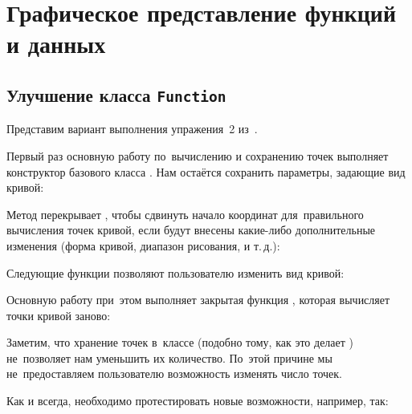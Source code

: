 
\chapter{Графическое представление функций и данных}

\section{Улучшение класса \texttt{Function}}
Представим вариант выполнения упражения~2 из~.


Первый раз основную работу по~вычислению и сохранению точек выполняет конструктор базового класса . Нам остаётся сохранить параметры, задающие вид кривой:


Метод  перекрывает , чтобы сдвинуть начало координат для~правильного вычисления точек кривой, если будут внесены какие-либо дополнительные изменения (форма кривой, диапазон рисования, и т.\,д.):


Следующие функции позволяют пользователю изменить вид кривой:


Основную работу при~этом выполняет закрытая функция , которая вычисляет точки кривой заново:


Заметим, что хранение точек в~классе  (подобно тому, как это делает \-) не~позволяет нам уменьшить их количество. По~этой причине мы не~предоставляем пользователю возможность изменять число точек.

Как и всегда, необходимо протестировать новые возможности, например, так:




